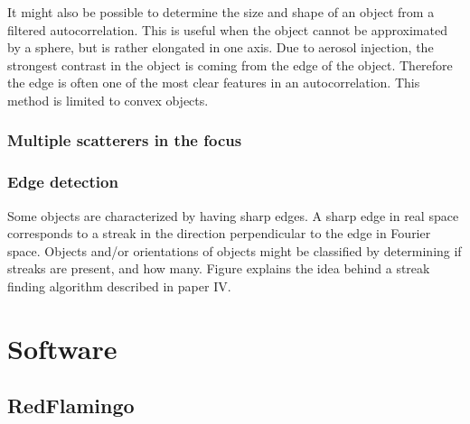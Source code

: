It might also be possible to determine the size and shape of an object from a filtered autocorrelation. This is useful when the object cannot be approximated by a sphere, but is rather elongated in one axis. Due to aerosol injection, the strongest contrast in the object is coming from the edge of the object. Therefore the edge is often one of the most clear features in an autocorrelation. This method is limited to convex objects.

\subsection{Multiple scatterers in the focus}


\subsection{Edge detection}
Some objects are characterized by having sharp edges. A sharp edge in real space corresponds to a streak in the direction perpendicular to the edge in Fourier space. Objects and/or orientations of objects might be classified by determining if streaks are present, and how many. Figure explains the idea behind a streak finding algorithm described in paper IV.


\chapter{Software}
\section{RedFlamingo}
